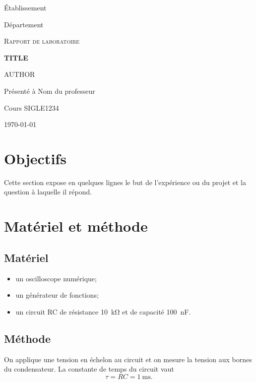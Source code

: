 \documentclass[11pt]{article}
\begin{document}
\begin{titlepage}
  \centering
  {\large Établissement \par}
  {\large Département \par}
  \vspace{4cm}
  {\scshape Rapport de laboratoire \par}
  \vspace{1cm}
  {\huge\bfseries {{TITLE}} \par}
  \vspace{2cm}
  {\Large {{AUTHOR}} \par}
  \vspace{1cm}
  Présenté à Nom du professeur \par
  Cours SIGLE1234 \par
  \vfill
  {\large \today \par}
\end{titlepage}

\tableofcontents
\newpage

\section{Objectifs}

Cette section expose en quelques lignes le but de l'expérience ou du projet
et la question à laquelle il répond.

\section{Matériel et méthode}

\subsection{Matériel}

\begin{itemize}
  \item un oscilloscope numérique;
  \item un générateur de fonctions;
  \item un circuit RC de résistance \qty{10}{\kilo\ohm} et de capacité
        \qty{100}{\nano\farad}.
\end{itemize}

\subsection{Méthode}

On applique une tension en échelon au circuit et on mesure la tension aux
bornes du condensateur. La constante de temps du circuit vaut
\begin{equation}
  \tau = RC = \qty{1}{\milli\second}.
  \label{eq:tau}
\end{equation}
\end{document}
